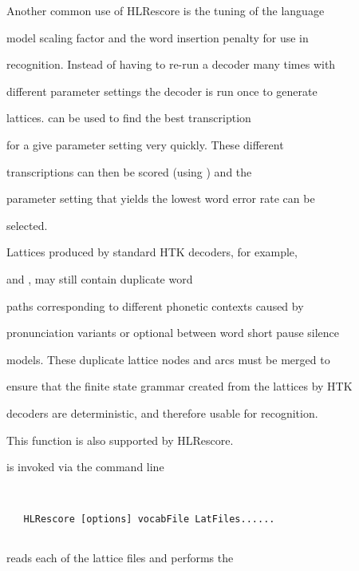 Another common use of HLRescore is the tuning of the language


model scaling factor and the word insertion penalty for use in


recognition. Instead of having to re-run a decoder many times with


different parameter settings the decoder is run once to generate


lattices.  can be used to find the best transcription


for a give parameter setting very quickly. These different


transcriptions can then be scored (using ) and the


parameter setting that yields the lowest word error rate can be


selected. 





Lattices produced by standard HTK decoders, for example,


 and , may still contain duplicate word


paths corresponding to different phonetic contexts caused by


pronunciation variants or optional between word short pause silence


models. These duplicate lattice nodes and arcs must be merged to


ensure that the finite state grammar created from the lattices by HTK


decoders are deterministic, and therefore usable for recognition. 


This function is also supported by HLRescore.













 is invoked via the command line


\begin{verbatim}


   HLRescore [options] vocabFile LatFiles......


\end{verbatim}





 reads each of the lattice files and performs the


